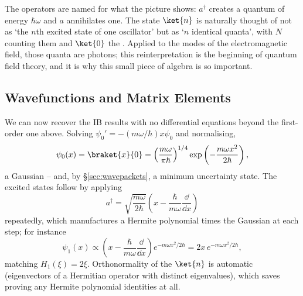 \begin{center}
\end{center}

The operators are named for what the picture shows: $a^\dagger$ creates a quantum of energy $\hbar\omega$ and $a$ annihilates one. The state $\ket{n}$ is naturally thought of not as `the $n$th excited state of one oscillator' but as `$n$ identical quanta', with $N$ counting them and $\ket{0}$ the . Applied to the modes of the electromagnetic field, those quanta are photons; this reinterpretation is the beginning of quantum field theory, and it is why this small piece of algebra is so important.

\subsection{Wavefunctions and Matrix Elements}

We can now recover the IB results with no differential equations beyond the first-order one above. Solving $\psi_0' = -(m\omega/\hbar)x\psi_0$ and normalising,
$$
\psi_0(x) = \braket{x}{0} = \left( \frac{m\omega}{\pi\hbar} \right)^{1/4} \exp\left( -\frac{m\omega x^2}{2\hbar} \right),
$$
a Gaussian -- and, by \S\ref{sec:wavepackets}, a minimum uncertainty state. The excited states follow by applying
$$
a^\dagger = \sqrt{\frac{m\omega}{2\hbar}}\left( x - \frac{\hbar}{m\omega}\frac{\dd}{\dd x} \right)
$$
repeatedly, which manufactures a Hermite polynomial times the Gaussian at each step; for instance
$$
\psi_1(x) \propto \left(x - \frac{\hbar}{m\omega}\frac{\dd}{\dd x}\right) e^{-m\omega x^2/2\hbar} = 2x \, e^{-m\omega x^2/2\hbar},
$$
matching $H_1(\xi) = 2\xi$. Orthonormality of the $\ket{n}$ is automatic (eigenvectors of a Hermitian operator with distinct eigenvalues), which saves proving any Hermite polynomial identities at all.

